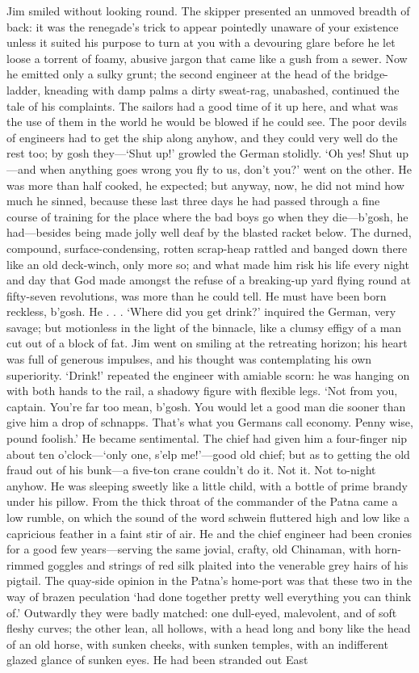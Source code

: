 Jim smiled without looking round. The skipper presented an unmoved breadth of back: it was the renegade’s trick to appear pointedly unaware of your existence unless it suited his purpose to turn at you with a devouring glare before he let loose a torrent of foamy, abusive jargon that came like a gush from a sewer. Now he emitted only a sulky grunt; the second engineer at the head of the bridge-ladder, kneading with damp palms a dirty sweat-rag, unabashed, continued the tale of his complaints. The sailors had a good time of it up here, and what was the use of them in the world he would be blowed if he could see. The poor devils of engineers had to get the ship along anyhow, and they could very well do the rest too; by gosh they—‘Shut up!’ growled the German stolidly. ‘Oh yes! Shut up—and when anything goes wrong you fly to us, don’t you?’ went on the other. He was more than half cooked, he expected; but anyway, now, he did not mind how much he sinned, because these last three days he had passed through a fine course of training for the place where the bad boys go when they die—b’gosh, he had—besides being made jolly well deaf by the blasted racket below. The durned, compound, surface-condensing, rotten scrap-heap rattled and banged down there like an old deck-winch, only more so; and what made him risk his life every night and day that God made amongst the refuse of a breaking-up yard flying round at fifty-seven revolutions, was more than he could tell. He must have been born reckless, b’gosh. He . . . ‘Where did you get drink?’ inquired the German, very savage; but motionless in the light of the binnacle, like a clumsy effigy of a man cut out of a block of fat. Jim went on smiling at the retreating horizon; his heart was full of generous impulses, and his thought was contemplating his own superiority. ‘Drink!’ repeated the engineer with amiable scorn: he was hanging on with both hands to the rail, a shadowy figure with flexible legs. ‘Not from you, captain. You’re far too mean, b’gosh. You would let a good man die sooner than give him a drop of schnapps. That’s what you Germans call economy. Penny wise, pound foolish.’ He became sentimental. The chief had given him a four-finger nip about ten o’clock—‘only one, s’elp me!’—good old chief; but as to getting the old fraud out of his bunk—a five-ton crane couldn’t do it. Not it. Not to-night anyhow. He was sleeping sweetly like a little child, with a bottle of prime brandy under his pillow. From the thick throat of the commander of the Patna came a low rumble, on which the sound of the word schwein fluttered high and low like a capricious feather in a faint stir of air. He and the chief engineer had been cronies for a good few years—serving the same jovial, crafty, old Chinaman, with horn-rimmed goggles and strings of red silk plaited into the venerable grey hairs of his pigtail. The quay-side opinion in the Patna’s home-port was that these two in the way of brazen peculation ‘had done together pretty well everything you can think of.’ Outwardly they were badly matched: one dull-eyed, malevolent, and of soft fleshy curves; the other lean, all hollows, with a head long and bony like the head of an old horse, with sunken cheeks, with sunken temples, with an indifferent glazed glance of sunken eyes. He had been stranded out East 